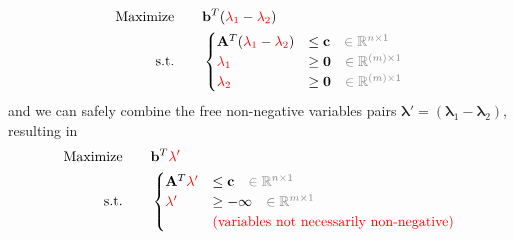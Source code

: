 \documentclass[twocolumn]{ctexart}
\begin{document}
\begin{equation}
    \begin{aligned}
        \label{eq:primal_standard_dual_partitioned}
        \text{Maximize} \qquad &
            \mathbf{b}^T
            ({\color{red} \mathbf{\lambda}_1} - {\color{red} \mathbf{\lambda}_2})
        \\
        \text{s.t.} \qquad &
            \begin{cases}
                \mathbf{A}^T
                ({\color{red} \mathbf{\lambda}_1} - {\color{red} \mathbf{\lambda}_2})
                &  \leq  \mathbf{c}  {\color{gray} \quad \in \mathbb{R}^{n \times 1}}
                \\
                {\color{red} \mathbf{\lambda}_1}  &  \geq  \mathbf{0}  {\color{gray} \quad \in \mathbb{R}^{(m) \times 1}}
                \\
                {\color{red} \mathbf{\lambda}_2}  &  \geq  \mathbf{0}  {\color{gray} \quad \in \mathbb{R}^{(m) \times 1}}
                \\
            \end{cases}
    \end{aligned}
\end{equation}
and we can safely combine the free non-negative variables pairs $\mathbf{\lambda}' = (\mathbf{\lambda}_1 - \mathbf{\lambda}_2)$, resulting in
\begin{equation}
    \begin{aligned}
        \label{eq:primal_standard_dual_partitioned_combined}
        \text{Maximize} \qquad &
            \mathbf{b}^T
            {\color{red} \mathbf{\lambda}'}
        \\
        \text{s.t.} \qquad &
            \begin{cases}
                \mathbf{A}^T
                {\color{red} \mathbf{\lambda}'}
                &  \leq  \mathbf{c}  {\color{gray} \quad \in \mathbb{R}^{n \times 1}}
                \\
                {\color{red} \mathbf{\lambda}'}  &  \geq  -\mathbf{\infty}  {\color{gray} \quad \in \mathbb{R}^{m \times 1}}
                \\
                & \text{\color{red}  (variables not necessarily non-negative)}
                \\
            \end{cases}
    \end{aligned}
\end{equation}
\end{document}
